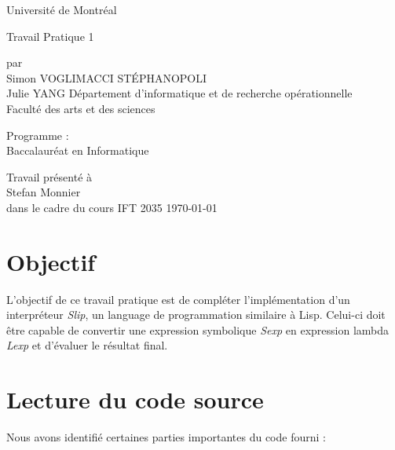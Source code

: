 \documentclass[12pt]{article}
\begin{document}
\begin{titlepage}
  \centering
  {Université de Montréal\par}
  \vfill
  {Travail Pratique 1\par}
  \vfill
  {par\\Simon \MakeUppercase{Voglimacci Stéphanopoli}\\Julie \MakeUppercase{Yang}}
  \vfill
  Département d'informatique et de recherche opérationnelle\\
  Faculté des arts et des sciences\par
  \vfill
  Programme :\\Baccalauréat en Informatique\par
  \vfill
  Travail présenté à\\Stefan Monnier\\dans le cadre du cours IFT 2035
  \vfill
  \today\par
\end{titlepage}

\section{Objectif}
L'objectif de ce travail pratique est de compléter l'implémentation d'un interpréteur \textit{Slip}, un language de programmation similaire à Lisp. Celui-ci doit être capable de convertir une expression symbolique \textit{Sexp} en expression lambda \textit{Lexp} et d'évaluer le résultat final.

\section{Lecture du code source}
Nous avons identifié certaines parties importantes du code fourni :
    
\end{document}
